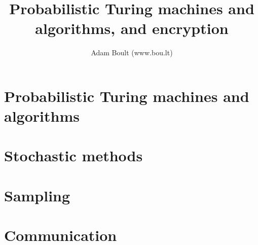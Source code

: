 \documentclass[oneside]{book}
\begin{document}
\author{Adam Boult (www.bou.lt)}
\title{Probabilistic Turing machines and algorithms, and encryption}
\maketitle

\setcounter{tocdepth}{0}
\tableofcontents



\part{Probabilistic Turing machines and algorithms}

\part{Stochastic methods}







\part{Sampling}


\part{Communication}




\end{document}
